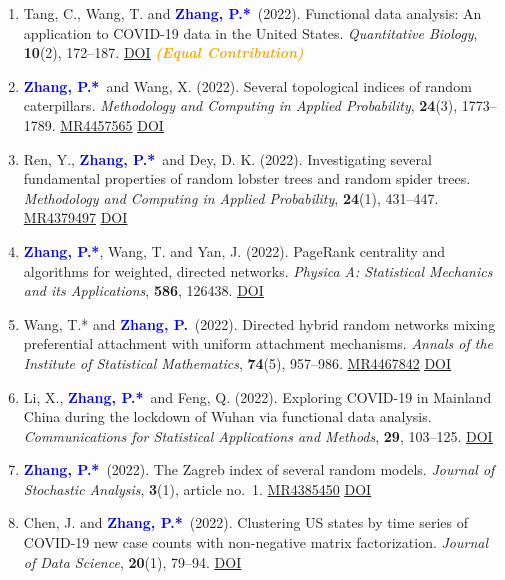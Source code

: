 \documentclass[12pt]{article}
\def \MR #1{\href{http://www.ams.org/mathscinet-getitem?mr=#1}{MR#1}}
\def \DOI #1{\href{http://doi.org/#1}{\underline{DOI}}}
\newcommand{\PZ}{\textcolor{blue}{\textbf{Zhang, P.*}}}
\newcommand{\PZnot}{\textcolor{blue}{\textbf{Zhang, P.}}}
\newcommand{\orange}[1]{\textcolor{orange}{#1}}
\begin{document}
\begin{enumerate}
		\item {\sc Tang, C., Wang, T.} and \PZ\ (2022). 
		Functional data analysis: An application to COVID-19 data in
		the United States. {\em Quantitative Biology}, {\bf 10}(2), 
		172--187. \DOI{10.15302/J-QB-022-0300}
		\orange{\bf \em (Equal Contribution)}
		
		\item \PZ\ and {\sc Wang, X.} (2022). Several 
		topological indices of random caterpillars. 
		{\em Methodology and Computing in Applied Probability}, {\bf 
		24}(3), 1773--1789. \MR{4457565} 
		\DOI{10.1007/s11009-021-09895-1}
		
		\item {\sc Ren, Y.}, \PZ\ and {\sc Dey, D. K.} (2022). 
		Investigating several fundamental properties of random 
		lobster trees and random spider trees. {\em Methodology and 
		Computing in Applied Probability}, {\bf 24}(1), 431--447. 
		\MR{4379497} \DOI{10.1007/s11009-021-09863-9} 
		
		\item \PZ, {\sc Wang, T.} and {\sc Yan, J.} (2022). PageRank 
		centrality and algorithms for weighted, directed networks. 
		{\em Physica A: Statistical Mechanics and its Applications}, 
		{\bf 586}, 126438. \DOI{10.1016/j.physa.2021.126438}
		
		\item {\sc Wang, T.*} and \PZnot\ (2022). Directed 
		hybrid random networks mixing preferential attachment with 
		uniform attachment mechanisms. {\em Annals of the Institute 
		of Statistical Mathematics}, {\bf 74}(5), 957--986. 
		\MR{4467842} \DOI{10.1007/s10463-022-00827-5}
		
		\item {\sc Li, X.}, \PZ\ and {\sc Feng, Q.} (2022). 
		Exploring COVID-19 in Mainland China during the lockdown of 
		Wuhan via functional data analysis. {\em Communications for 
		Statistical Applications and Methods}, {\bf 29}, 103--125. 
		\DOI{10.29220/CSAM.2022.29.1.103}
		
		\item \PZ\ (2022). The Zagreb index of several random 
		models. {\em Journal of Stochastic Analysis}, {\bf 3}(1), 
		article no.\ 1. \MR{4385450} \DOI{10.31390/josa.3.1.01}
		
		\item {\sc Chen, J.} and \PZ\ (2022). Clustering US states by time series of COVID-19 new case counts with non-negative matrix	factorization. {\em Journal of Data Science}, {\bf 20}(1), 79--94.
		\href{https://doi.org/10.6339/22-JDS1036}{\underline{DOI}}
		

\end{enumerate}
\end{document}
